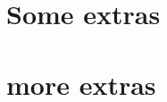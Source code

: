 \documentclass[jdecimal, citestyle=apa, 11pt]{maine-thesis}  %
\begin{document}
\appendix					%
\chapter{Some extras}
\blindtext
\chapter{more extras}
\blindtext
\end{document}
